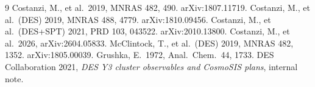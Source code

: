 \documentclass[a4paper, 11pt]{article}
\begin{document}
{\footnotesize
\begin{thebibliography}{9}
 Costanzi, M., et al.\ 2019, MNRAS 482, 490. arXiv:1807.11719.
 Costanzi, M., et al.\ (DES) 2019, MNRAS 488, 4779. arXiv:1810.09456.
 Costanzi, M., et al.\ (DES+SPT) 2021, PRD 103, 043522. arXiv:2010.13800.
 Costanzi, M., et al.\ 2026, arXiv:2604.05833.
 McClintock, T., et al.\ (DES) 2019, MNRAS 482, 1352. arXiv:1805.00039.
 Grushka, E.\ 1972, Anal.\ Chem.\ 44, 1733.
 DES Collaboration 2021, \textit{DES Y3 cluster observables and CosmoSIS plans}, internal note.
\end{thebibliography}
}
\end{document}

